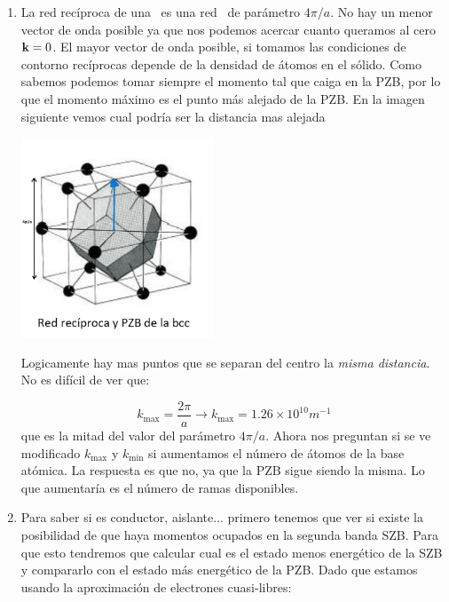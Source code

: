 \begin{solucion}
	\begin{enumerate}
	\item La red recíproca de una \bcc \ es una red \fcc \ de parámetro $4\pi/a$. No hay un menor vector de onda posible ya que nos podemos acercar cuanto queramos al cero $\mathbf{k}=0$. El mayor vector de onda posible, si tomamos las condiciones de contorno recíprocas depende de la densidad de átomos en el sólido. Como sabemos podemos tomar siempre el momento tal que caiga en la PZB, por lo que el momento máximo es el punto más alejado de la PZB. En la imagen siguiente vemos cual podría ser la distancia mas alejada
	
	\begin{center}
		\includegraphics[width=0.45\textwidth]{Imagenes/Enero_2021_03_2.png}
	\end{center}
	Logicamente hay mas puntos que se separan del centro la \textit{misma distancia}. No es difícil de ver que:
	
	\begin{equation*}
		k_{\max} = \frac{2\pi}{a} \rightarrow k_{\max} = 1.26 \times 10^{10} \unit{m^{-1}}
	\end{equation*}
	que es la mitad del valor del parámetro $4\pi/a$. Ahora nos preguntan si se ve modificado $k_{\max}$ y $k_{\min}$ si aumentamos el número de átomos de la base atómica. La respuesta es que no, ya que la PZB sigue siendo la misma. Lo que aumentaría es el número de ramas disponibles. 
	
	\item Para saber si es conductor, aislante... primero tenemos que ver si existe la posibilidad de que haya momentos ocupados en la segunda banda SZB. Para que esto tendremos que calcular cual es el estado menos energético de la SZB y compararlo con el estado más energético de la PZB. Dado que estamos usando la aproximación de electrones cuasi-libres:
	

\end{enumerate}
\end{solucion}
